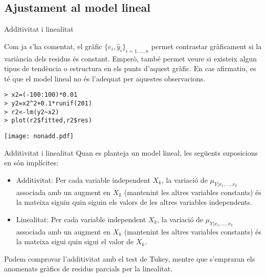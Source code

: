 \documentclass[12pt,t]{beamer}
\renewcommand{\emph}[1]{{\color{red}#1}}
\theoremstyle{plain}
\theoremstyle{definition}
\begin{document}
\subsection{Ajustament al model lineal}
\begin{frame}[fragile]{Additivitat i linealitat}

Com ja s'ha comentat, el gràfic $\{e_i,\hat{y}_i\}_{i=1,\ldots,n}$ permet contrastar gràficament si la variància dels residus és constant. Emperò, també permet veure si existeix algun tipus de tendència o estructura en els punts d'aquest gràfic. En cas afirmatiu, es té que el model lineal no és l'adequat per aquestes observacions. 

\vspace{0.25cm}

\begin{minipage}[c]{0.4\linewidth}


\begin{footnotesize}

\begin{verbatim}
> x2=(-100:100)*0.01
> y2=x2^2+0.1*runif(201)
> r2<-lm(y2~x2)
> plot(r2$fitted,r2$res)
\end{verbatim}
\end{footnotesize}

\end{minipage}
\hfill
\begin{minipage}[c]{0.5\linewidth}

\texttt{[image: nonadd.pdf]}

\end{minipage}

\end{frame}

\begin{frame}{Additivitat i linealitat}
Quan es planteja un model lineal, les següents suposicions en són implícites:
\begin{itemize}
\item \emph{Additivitat}: Per cada variable independent $X_k$, la variació de $\mu_{Y|x_1,\ldots,x_k}$ associada amb un augment en $X_k$ (mantenint les altres variables constants) és la mateixa siguin quin siguin els valors de les altres variables independents.
\item \emph{Linealitat}:  Per cada variable independent $X_k$, la variació de $\mu_{Y|x_1,\ldots,x_k}$ associada amb un augment en $X_k$ (mantenint les altres variables constants) és la mateixa sigui quin sigui el valor de $X_k$.
\end{itemize}

Podem comprovar l'additivitat amb el test de Tukey, mentre que s'empraran els anomenats gràfics de residus parcials per la linealitat.

\end{frame}
\end{document}
